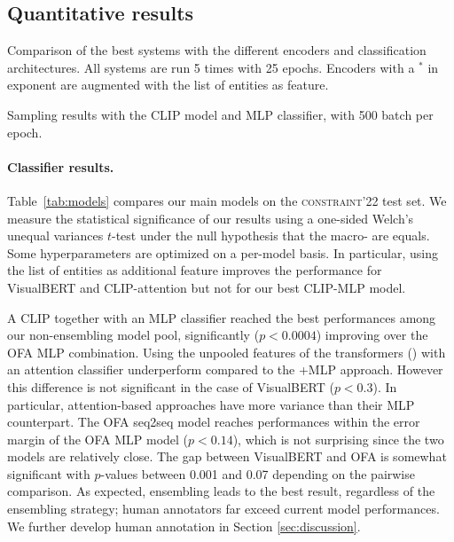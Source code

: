 \subsection{Quantitative results}


\begin{table}[t]
	\centering
	
	\caption{Comparison of the best systems with the different encoders and classification architectures. All systems are run 5 times with 25 epochs. Encoders with a $^*$ in exponent are augmented with the list of entities as feature.}
	\label{tab:models}	
\end{table}

\begin{table}[t]
	\centering
	
	\caption{Sampling results with the CLIP model and MLP classifier, with 500 batch per epoch.}
	\label{tab:sampling}
\end{table}

\paragraph{Classifier results.}
Table~\ref{tab:models} compares our main models on the \textsc{constraint}'22 test set.
We measure the statistical significance of our results using a one-sided Welch's unequal variances \(t\)-test \citep{welch} under the null hypothesis that the macro-\fone{} are equals.
Some hyperparameters are optimized on a per-model basis. In particular,  using the list of entities as additional feature improves the performance for VisualBERT and CLIP-attention but not for our best CLIP-MLP model.

A CLIP \encoder[pool] together with an MLP classifier reached the best performances among our non-ensembling model pool, significantly (\(p<0.0004\)) improving over the OFA MLP combination.
Using the unpooled features of the transformers (\encoder[full]) with an attention classifier underperform compared to the \encoder[pool]+MLP approach.
However this difference is not significant in the case of VisualBERT (\(p<0.3\)).
In particular, attention-based approaches have more variance than their MLP counterpart.
The OFA seq2seq model reaches performances within the error margin of the OFA MLP model (\(p<0.14\)), which is not surprising since the two models are relatively close.
The gap between VisualBERT and OFA is somewhat significant with \(p\)-values between 0.001 and 0.07 depending on the pairwise comparison.
As expected, ensembling leads to the best result, regardless of the ensembling strategy; human annotators far exceed current model performances.
We further develop human annotation in Section \ref{sec:discussion}.


